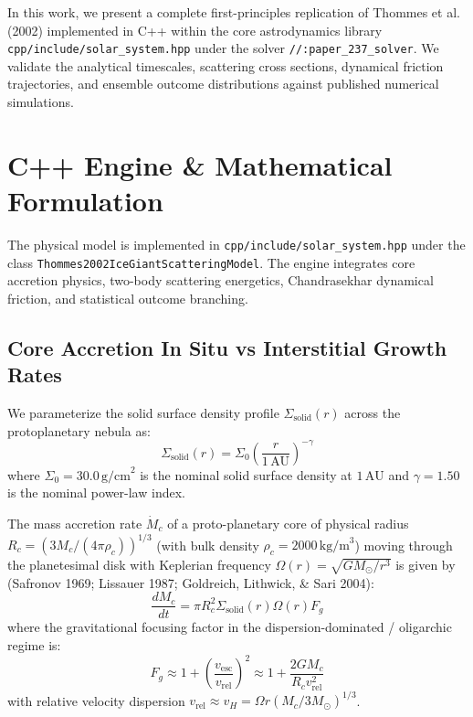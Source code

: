 \documentclass[11pt,a4paper]{article}
\begin{document}
In this work, we present a complete first-principles replication of Thommes et al. (2002) implemented in C++ within the core astrodynamics library \texttt{cpp/include/solar\_system.hpp} under the solver \texttt{//:paper\_237\_solver}. We validate the analytical timescales, scattering cross sections, dynamical friction trajectories, and ensemble outcome distributions against published numerical simulations.

\section{C++ Engine \& Mathematical Formulation}
The physical model is implemented in \texttt{cpp/include/solar\_system.hpp} under the class \texttt{Thommes2002IceGiantScatteringModel}. The engine integrates core accretion physics, two-body scattering energetics, Chandrasekhar dynamical friction, and statistical outcome branching.

\subsection{Core Accretion In Situ vs Interstitial Growth Rates}
We parameterize the solid surface density profile $\Sigma_{\text{solid}}(r)$ across the protoplanetary nebula as:
\begin{equation}
\Sigma_{\text{solid}}(r) = \Sigma_0 \left(\frac{r}{1\,\text{AU}}\right)^{-\gamma}
\label{eq:sigma_profile}
\end{equation}
where $\Sigma_0 = 30.0\,\text{g/cm}^2$ is the nominal solid surface density at $1\,\text{AU}$ and $\gamma = 1.50$ is the nominal power-law index.

The mass accretion rate $\dot{M}_c$ of a proto-planetary core of physical radius $R_c = (3 M_c / (4\pi \rho_c))^{1/3}$ (with bulk density $\rho_c = 2000\,\text{kg/m}^3$) moving through the planetesimal disk with Keplerian frequency $\Omega(r) = \sqrt{G M_\odot / r^3}$ is given by (Safronov 1969; Lissauer 1987; Goldreich, Lithwick, \& Sari 2004):
\begin{equation}
\frac{dM_c}{dt} = \pi R_c^2 \Sigma_{\text{solid}}(r) \Omega(r) F_g
\label{eq:dM_dt}
\end{equation}
where the gravitational focusing factor in the dispersion-dominated / oligarchic regime is:
\begin{equation}
F_g \approx 1 + \left(\frac{v_{\text{esc}}}{v_{\text{rel}}}\right)^2 \approx 1 + \frac{2 G M_c}{R_c v_{\text{rel}}^2}
\label{eq:grav_focusing}
\end{equation}
with relative velocity dispersion $v_{\text{rel}} \approx v_H = \Omega r (M_c / 3 M_\odot)^{1/3}$.
\end{document}

